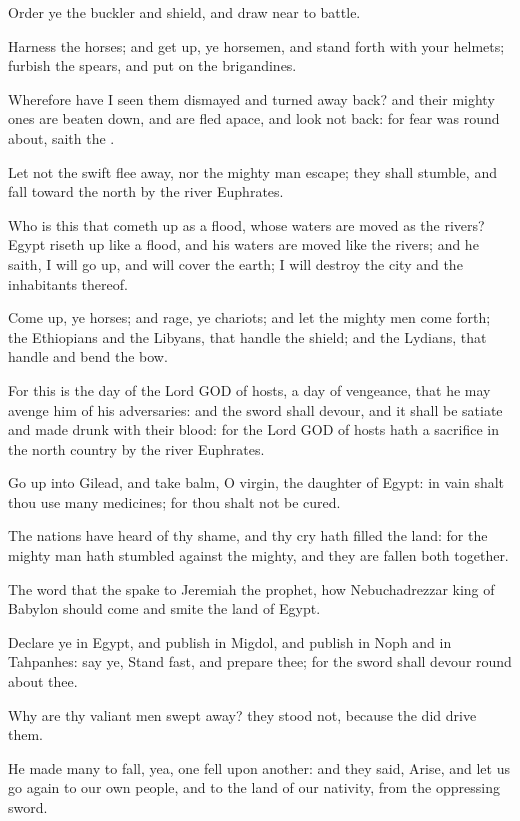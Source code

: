 \verse Order ye the buckler and shield, and draw near to battle.

\verse Harness the horses; and get up, ye horsemen, and stand forth with your helmets; furbish the spears, and put on the brigandines.

\verse Wherefore have I seen them dismayed and turned away back? and their mighty ones are beaten down, and are fled apace, and look not back: for fear was round about, saith the \LORD.

\verse Let not the swift flee away, nor the mighty man escape; they shall stumble, and fall toward the north by the river Euphrates.

\verse Who is this that cometh up as a flood, whose waters are moved as the rivers?  \verse Egypt riseth up like a flood, and his waters are moved like the rivers; and he saith, I will go up, and will cover the earth; I will destroy the city and the inhabitants thereof.

\verse Come up, ye horses; and rage, ye chariots; and let the mighty men come forth; the Ethiopians and the Libyans, that handle the shield; and the Lydians, that handle and bend the bow.

\verse For this is the day of the Lord GOD of hosts, a day of vengeance, that he may avenge him of his adversaries: and the sword shall devour, and it shall be satiate and made drunk with their blood: for the Lord GOD of hosts hath a sacrifice in the north country by the river Euphrates.

\verse Go up into Gilead, and take balm, O virgin, the daughter of Egypt: in vain shalt thou use many medicines; for thou shalt not be cured.

\verse The nations have heard of thy shame, and thy cry hath filled the land: for the mighty man hath stumbled against the mighty, and they are fallen both together.

\verse The word that the \LORD spake to Jeremiah the prophet, how Nebuchadrezzar king of Babylon should come and smite the land of Egypt.

\verse Declare ye in Egypt, and publish in Migdol, and publish in Noph and in Tahpanhes: say ye, Stand fast, and prepare thee; for the sword shall devour round about thee.

\verse Why are thy valiant men swept away? they stood not, because the \LORD did drive them.

\verse He made many to fall, yea, one fell upon another: and they said, Arise, and let us go again to our own people, and to the land of our nativity, from the oppressing sword.

